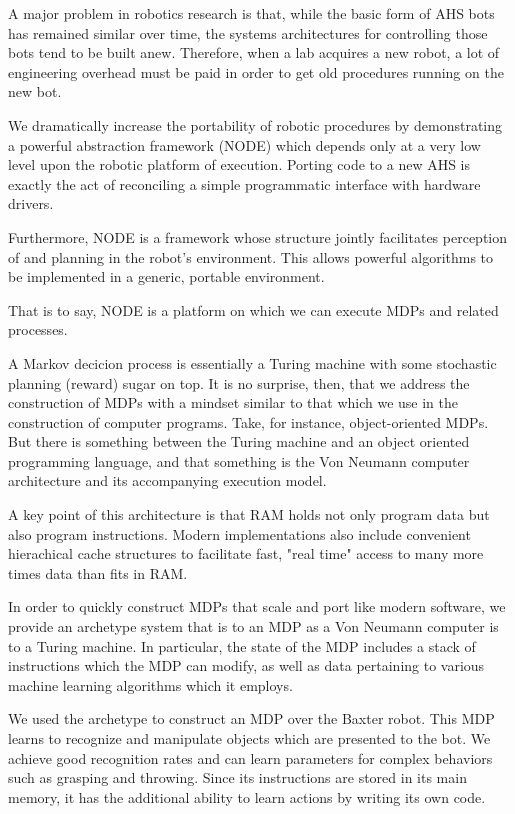 \documentclass[conference]{IEEEtran}
\begin{document}
A major problem in robotics research is that, while the basic form of AHS bots has remained
similar over time, the systems architectures for controlling those bots tend to be built 
anew. Therefore, when a lab acquires a new robot, a lot of engineering overhead must be paid
in order to get old procedures running on the new bot.

We dramatically increase the portability of robotic procedures by demonstrating a powerful
abstraction framework (NODE) which depends only at a very low level upon the robotic platform
of execution. Porting code to a new AHS is exactly the act of reconciling a simple programmatic
interface with hardware drivers.

Furthermore, NODE is a framework whose structure jointly facilitates perception of 
and planning in the robot's environment. This allows powerful algorithms to be implemented in a
generic, portable environment.

That is to say, NODE is a platform on which we can execute MDPs and related processes.

A Markov decicion process is essentially a Turing machine with some stochastic planning (reward)
sugar on top. It is no surprise, then, that we address the construction of MDPs with a mindset similar
to that which we use in the construction of computer programs. Take, for instance, object-oriented MDPs. But there
is something between the Turing machine and an object oriented programming language, and that
something is the Von Neumann computer architecture and its accompanying execution model.

A key point of this architecture is that RAM holds not only program data but also program instructions.
Modern implementations also include convenient hierachical cache structures to facilitate fast,
"real time" access to many more times data than fits in RAM.

In order to quickly construct MDPs that scale and port like modern software, we provide an
archetype system that is to an MDP as a Von Neumann computer is to a Turing machine.
In particular, the state of the MDP includes a stack of instructions which the MDP
can modify, as well as data pertaining to various machine learning algorithms which it employs.

We used the archetype to construct an MDP over the Baxter robot. This MDP learns to recognize and manipulate
objects which are presented to the bot. We achieve good recognition rates and can learn parameters 
for complex behaviors such as grasping and throwing. Since its instructions are stored in its main memory, 
it has the additional ability to learn actions by writing its own code.
\end{document}
